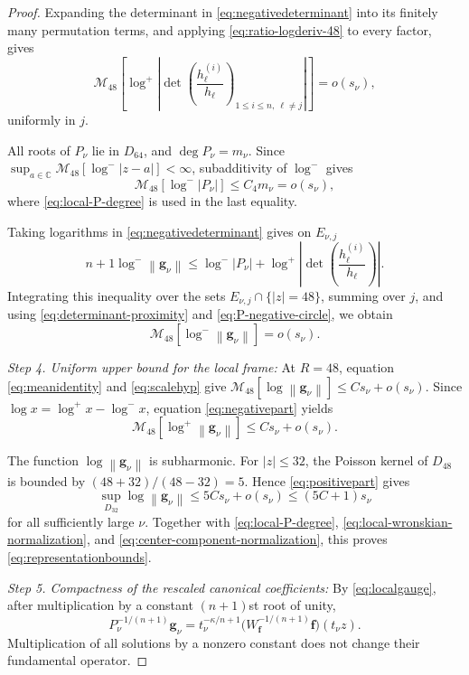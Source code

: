 \documentclass[12pt,letterpaper,reqno]{amsart}
\theoremstyle{definition}
\numberwithin{equation}{section}
\newcommand{\C}{\mathbb C}
\newcommand{\mean}[2]{\mathcal M_{#1}\!\left[#2\right]}
\newcommand{\norm}[1]{\left\lVert#1\right\rVert}
\newcommand{\fv}{\bm f}
\newcommand{\gv}{\bm g}
\begin{document}
\begin{proof}
Expanding the determinant in \eqref{eq:negativedeterminant} into its
finitely many permutation terms, and applying
\eqref{eq:ratio-logderiv-48} to every factor, gives
\begin{equation}\label{eq:determinant-proximity}
 \mean{48}{
 \log^+
 \left|
 \det\left(
 \frac{h_\ell^{(i)}}{h_\ell}
 \right)_{
 1\leq i\leq n,\ \ell\ne j}
 \right|
 }
 =
 o(s_\nu),
\end{equation}
uniformly in \(j\).

All roots of \(P_\nu\) lie in \(D_{64}\), and
\(\deg P_\nu=m_\nu\). Since
\(\sup_{a\in\C}\mean{48}{\log^-|z-a|}<\infty\),
subadditivity of \(\log^-\) gives
\begin{equation}\label{eq:P-negative-circle}
 \mean{48}{\log^-|P_\nu|}
 \leq
 C_4m_\nu
 =
 o(s_\nu),
\end{equation}
where \eqref{eq:local-P-degree} is used in the last equality.

Taking logarithms in \eqref{eq:negativedeterminant} gives on
\(E_{\nu,j}\)
\[
 {n+1}\log^-\norm{\gv_\nu}
 \leq
 \log^-|P_\nu|
 +
 \log^+
 \left|
 \det\left(
 \frac{h_\ell^{(i)}}{h_\ell}
 \right)
 \right|.
\]
Integrating this inequality over the sets \(E_{\nu,j}\cap\{|z|=48\}\),
summing over \(j\), and using
\eqref{eq:determinant-proximity} and
\eqref{eq:P-negative-circle}, we obtain
\begin{equation}\label{eq:negativepart}
 \mean{48}{\log^-\norm{\gv_\nu}}
 =
 o(s_\nu).
\end{equation}


\medskip\noindent
\emph{{Step 4. Uniform upper bound for the local frame:}}
At \(R=48\), equation \eqref{eq:meanidentity} and
\eqref{eq:scalehyp} give
\(\mean{48}{\log\norm{\gv_\nu}}\leq Cs_\nu+o(s_\nu)\).
Since
\(\log x=\log^+x-\log^-x\),
equation \eqref{eq:negativepart} yields
\begin{equation}\label{eq:positivepart}
 \mean{48}{\log^+\norm{\gv_\nu}}
 \leq
 Cs_\nu+o(s_\nu).
\end{equation}

The function \(\log\norm{\gv_\nu}\) is subharmonic. For
\(|z|\leq32\), the Poisson kernel of \(D_{48}\) is bounded by
\((48+32)/(48-32)=5\). Hence \eqref{eq:positivepart} gives
\[
 \sup_{D_{32}}\log\norm{\gv_\nu}
 \leq
 5Cs_\nu+o(s_\nu)
 \leq
 (5C+1)s_\nu
\]
for all sufficiently large \(\nu\). Together with
\eqref{eq:local-P-degree},
\eqref{eq:local-wronskian-normalization}, and
\eqref{eq:center-component-normalization}, this proves
\eqref{eq:representationbounds}.


\medskip\noindent
\emph{{Step 5. Compactness of the rescaled canonical coefficients:}}
By \eqref{eq:localgauge}, after multiplication by a constant
\((n+1)\)st root of unity,
\[
 P_\nu^{-1/(n+1)}\gv_\nu
 =
 t_\nu^{-\kappa/{n+1}}
 \bigl(W_{\fv}^{-1/(n+1)}\fv\bigr)(t_\nu z).
\]
Multiplication of all solutions by a nonzero constant does not change
their fundamental operator.


\end{proof}
\end{document}
